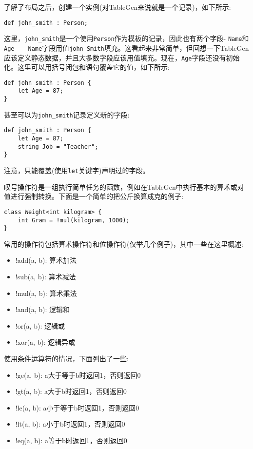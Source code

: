了解了布局之后，创建一个实例(对TableGen来说就是一个记录)，如下所示:

\begin{lstlisting}[style=styleCXX]
def john_smith : Person;
\end{lstlisting}

这里，\texttt{john\_smith}是一个使用\texttt{Person}作为模板的记录，因此也有两个字段- \texttt{Name}和\texttt{Age}——\texttt{Name}字段用值\texttt{john Smith}填充。这看起来非常简单，但回想一下TableGen应该定义静态数据，并且大多数字段应该用值填充。现在，\texttt{Age}字段还没有初始化。这里可以用括号闭包和语句覆盖它的值，如下所示:

\begin{lstlisting}[style=styleCXX]
def john_smith : Person {
	let Age = 87;
}
\end{lstlisting}

甚至可以为\texttt{john\_smith}记录定义新的字段:

\begin{lstlisting}[style=styleCXX]
def john_smith : Person {
	let Age = 87;
	string Job = "Teacher";
}
\end{lstlisting}

注意，只能覆盖(使用\texttt{let}关键字)声明过的字段。


叹号操作符是一组执行简单任务的函数，例如在TableGen中执行基本的算术或对值进行强制转换。下面是一个简单的把公斤换算成克的例子:

\begin{lstlisting}[style=styleCXX]
class Weight<int kilogram> {
	int Gram = !mul(kilogram, 1000);
}
\end{lstlisting}

常用的操作符包括算术操作符和位操作符(仅举几个例子)，其中一些在这里概述:

\begin{itemize}
\ttfamily
\item !add(a, b): 算术加法
\item !sub(a, b): 算术减法
\item !mul(a, b): 算术乘法
\item !and(a, b): 逻辑和
\item !or(a, b): 逻辑或
\item !xor(a, b): 逻辑异或
\end{itemize}

使用条件运算符的情况，下面列出了一些:

\begin{itemize}
\ttfamily
\item !ge(a, b): a大于等于b时返回1，否则返回0
\item !gt(a, b): a大于b时返回1，否则返回0
\item !le(a, b): a小于等于b时返回1，否则返回0
\item !lt(a, b): a小于b时返回1，否则返回0
\item !eq(a, b): a等于b时返回1，否则返回0
\end{itemize}

